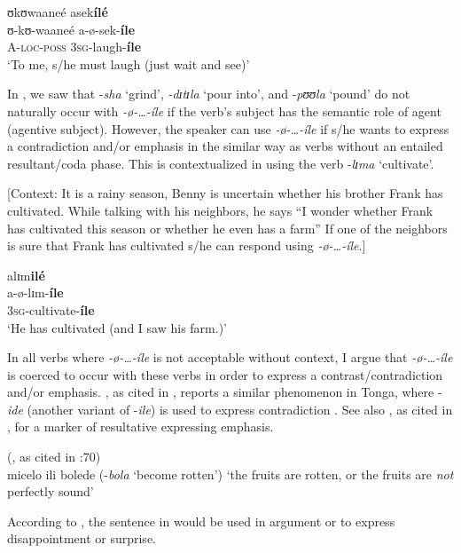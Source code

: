 \documentclass[output=paper,newtxmath,modfonts,nonflat,draftmode]{langsci/langscibook}
\begin{document}
\ea \label{ex:kanijo:29}
\ea
\glll ʊkʊwaaneé    asek\textbf{ílé}\\
  ʊ-kʊ-waaneé a-ø-sek-\textbf{íle}\\
   A-\textsc{loc}-\textsc{poss}  3\textsc{sg}-laugh-\textbf{íle}\\
  \glt ‘To me, s/he must laugh (just wait and see)’
\z
\z

In , we saw that -\textit{sha} ‘grind’, \textit{-dɪtɪla} ‘pour into’, and -\textit{pʊʊla} ‘pound’ do not naturally occur with \textit{-ø-…-íle} if the verb’s subject has the semantic role of agent (agentive subject). However, the speaker can use \textit{-ø-…-íle} if s/he wants to express a contradiction and/or emphasis in the similar way as verbs without an entailed resultant/coda phase. This is contextualized in  using the verb -\textit{lɪma} ‘cultivate’.\pagebreak

\ea \label{ex:kanijo:30}
[Context: It is a rainy season, Benny is uncertain whether his brother Frank has cultivated. While talking with his neighbors, he says “I wonder whether Frank has cultivated this season or whether he even has a farm” If one of the neighbors is sure that Frank has cultivated s/he can respond using \textit{-ø-…-íle}.]

\glll alɪm\textbf{ilé}\\
a-ø-lɪm-\textbf{íle}\\
3\textsc{sg}-cultivate-\textbf{íle}\\
\glt ‘He has cultivated (and I saw his farm.)’
\z

In all verbs where \textit{-ø-…-íle} is not acceptable without context, I argue that \textit{-ø-…-íle} is coerced to occur with these verbs in order to express a contrast\slash contradiction and/or emphasis. \citet{Collins1962}, as cited in \citet[70]{Crane2012}, reports a similar phenomenon in Tonga, where -\textit{ide} (another variant of -\textit{ile}) is used to express contradiction . See also \citet{Woidich1975}, as cited in \citet[194]{Ebert1995}, for a marker of resultative expressing emphasis. 

\ea \label{ex:kanijo:31}  (\citealt{Collins1962}, as cited in \citealt{Crane2012}:70)\\
micelo ili bolede (-\textit{bola} ‘become rotten’)
\glt   ‘the fruits are rotten, or the fruits are \textit{not} perfectly sound’ 
\z

According to \citet{Collins1962}, the sentence in  would be used in argument or to express disappointment or surprise. 
\end{document}
